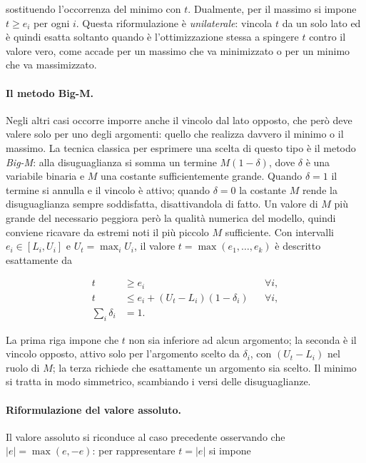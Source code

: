 sostituendo l'occorrenza del minimo con $t$. Dualmente, per il massimo si
impone $t \ge e_i$ per ogni $i$. Questa riformulazione è \emph{unilaterale}:
vincola $t$ da un solo lato ed è quindi esatta soltanto quando è
l'ottimizzazione stessa a spingere $t$ contro il valore vero, come accade per
un massimo che va minimizzato o per un minimo che va massimizzato.

\paragraph{Il metodo Big-M.}
Negli altri casi occorre imporre anche il vincolo dal lato opposto, che però
deve valere solo per uno degli argomenti: quello che realizza davvero il
minimo o il massimo. La tecnica classica per esprimere una scelta di questo
tipo è il metodo \emph{Big-M}: alla disuguaglianza si somma un termine
$M(1-\delta)$, dove $\delta$ è una variabile binaria e $M$ una costante
sufficientemente grande. Quando $\delta = 1$ il termine si annulla e il
vincolo è attivo; quando $\delta = 0$ la costante $M$ rende la disuguaglianza
sempre soddisfatta, disattivandola di fatto. Un valore di $M$ più grande del
necessario peggiora però la qualità numerica del modello, quindi conviene
ricavare da estremi noti il più piccolo $M$ sufficiente. Con intervalli
$e_i \in [L_i, U_i]$ e $U_t = \max_i U_i$, il valore $t = \max(e_1, \dots,
e_k)$ è descritto esattamente da

\begin{equation}
\label{eq:max-exact}
\begin{aligned}
t &\ge e_i && \forall i,\\
t &\le e_i + (U_t-L_i)(1-\delta_i) && \forall i,\\
\textstyle\sum_i \delta_i &= 1.
\end{aligned}
\end{equation}

La prima riga impone che $t$ non sia inferiore ad alcun argomento; la seconda
è il vincolo opposto, attivo solo per l'argomento scelto da $\delta_i$, con
$(U_t-L_i)$ nel ruolo di $M$; la terza richiede che esattamente un argomento
sia scelto. Il minimo si tratta in modo simmetrico, scambiando i versi delle
disuguaglianze.

\paragraph{Riformulazione del valore assoluto.}
Il valore assoluto si riconduce al caso precedente osservando che $|e| =
\max(e, -e)$: per rappresentare $t = |e|$ si impone

